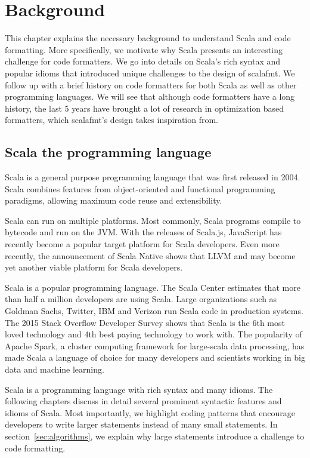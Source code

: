 \section{Background}
This chapter explains the necessary background to understand Scala and code formatting.
More specifically, we motivate why Scala presents an interesting challenge for code formatters.
We go into details on Scala's rich syntax and popular idioms that introduced unique challenges to the design of scalafmt.
We follow up with a brief history on code formatters for both Scala as well as other programming languages.
We will see that although code formatters have a long history, the last 5 years have brought a lot of research in optimization based formatters, which scalafmt's design takes inspiration from.

\subsection{Scala the programming language}
Scala\autocite{odersky_scala_2004} is a general purpose programming language that was first released in 2004.
Scala combines features from object-oriented and functional programming paradigms, allowing maximum code reuse and extensibility.

Scala can run on multiple platforms.
Most commonly, Scala programs compile to bytecode and run on the JVM.
With the releases of Scala.js\autocite{_scala.js_????-1}, JavaScript has recently become a popular target platform for Scala developers.
Even more recently, the announcement of Scala Native\autocite{_scala-native/scala-native_????} shows that LLVM and may become yet another viable platform for Scala developers.

Scala is a popular programming language.
The Scala Center estimates that more than half a million developers are using Scala\autocite{odersky_scala_2016}.
Large organizations such as Goldman Sachs, Twitter, IBM and Verizon run Scala code in production systems.
The 2015 Stack Overflow Developer Survey shows that Scala is the 6th most loved technology and 4th best paying technology to work with\autocite{_stack_????}.
The popularity of Apache Spark\autocite{_apache_????-1}, a cluster computing framework for large-scala data processing, has made Scala a language of choice for many developers and scientists working in big data and machine learning.

Scala is a programming language with rich syntax and many idioms.
The following chapters discuss in detail several prominent syntactic features and idioms of Scala.
Most importantly, we highlight coding patterns that encourage developers to write larger statements instead of many small statements.
In section~\ref{sec:algorithms}, we explain why large statements introduce a challenge to code formatting.


